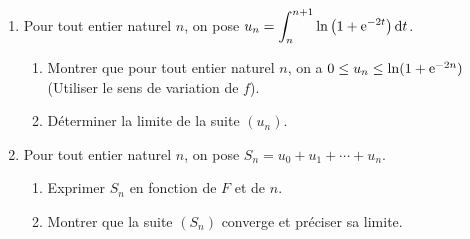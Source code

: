 \begin{exo}
\begin{description}
\begin{enumerate}
                              \'Etablir que $\frac{1}{2} \ln 2 \leq \ell \leq \frac{1}{2}$.
                        \item Pour tout entier naturel $n$, on pose 
                              $
                              u_n = \displaystyle{
                                          \int_{n}^{n+1} \ln \left( 1 + \mathrm{e}^{-2t} \right) \mathrm{d}t}
                              $.
                              \begin{enumerate}
                                    \item Montrer que pour tout entier naturel $n$, on a 
                                          $0 \leq u_n \leq \ln (1 + \mathrm{e}^{-2n})$
                                          (Utiliser le sens de variation de $f$).
                                    \item D\'eterminer la limite de la suite $(u_n)$.
                              \end{enumerate}
                        \item Pour tout entier naturel $n$, on pose $S_n = u_0 + u_1 + \cdots + u_n$.
                              \begin{enumerate}
                                    \item Exprimer $S_n$ en fonction de $F$ et de $n$.
                                    \item Montrer que la suite $(S_n)$ converge et pr\'eciser sa limite.
                              \end{enumerate}
                  \end{enumerate}
      \end{description}
\end{exo}

